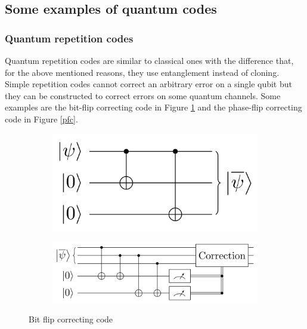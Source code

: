 \documentclass{article}
\begin{document}
\subsection{Some examples of quantum codes}

\subsubsection{Quantum repetition codes}

Quantum repetition codes are similar to classical ones with the difference that, for the
above mentioned reasons, they use entanglement instead of cloning.
Simple repetition codes cannot correct an arbitrary error on a single qubit but they can
be constructed to correct errors on some quantum channels.
Some examples are the bit-flip correcting code in Figure \ref{bfc}
and the phase-flip correcting code in Figure \ref{pfc}.

\begin{figure}[H]

	\begin{subfigure}{0.5\textwidth}
		\includegraphics[scale = 0.23]{bit-flip-encode.png}
	\end{subfigure}
	\hspace{-60pt}
	\begin{subfigure}{0.5\textwidth}
		\includegraphics[scale = 0.23]{bit-flip-detect.png}
	\end{subfigure}

	\caption{Bit flip correcting code}\label{bfc}
\end{figure}
\end{document}
